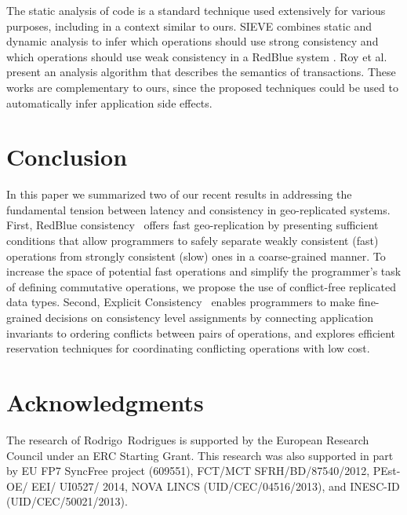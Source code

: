 \documentclass[11pt,dvipdfm]{article}
\begin{document}
The static analysis of code is a standard technique used extensively for
various purposes,
including in a context similar to ours.
SIEVE \cite{Li14Automating} combines static and dynamic analysis to infer
which operations should use strong consistency and which operations should
use weak consistency in a RedBlue system \cite{Li2012RedBlue}.
Roy et al. \cite{Roy14Writes} present an analysis algorithm that
describes the semantics of transactions.
These works are complementary to ours, since the proposed techniques
could be used to automatically infer application side effects.

\section{Conclusion}
\label{sec:conc}

In this paper we summarized two of our recent results in addressing the fundamental tension
between latency and consistency in geo-replicated systems. First,
RedBlue consistency~\cite{Li2012RedBlue} offers fast geo-replication by
presenting sufficient conditions that allow programmers to safely separate
weakly consistent (fast) operations from strongly consistent (slow) ones in
a coarse-grained manner. To increase the space of potential fast operations
and simplify the programmer's task of defining commutative operations,
we propose the use of conflict-free replicated data types. Second,  Explicit Consistency~\cite{Balegas2015Indigo}
enables programmers to make fine-grained decisions on consistency level assignments
by connecting application invariants to ordering conflicts between pairs of operations,
and explores efficient reservation techniques for coordinating conflicting operations with
low cost.

\section*{Acknowledgments}

The research of Rodrigo\ Rodrigues is supported by the European Research Council under an ERC Starting Grant.
This research was also supported in part
    by EU FP7 SyncFree project (609551),
    FCT/MCT SFRH/BD/87540/2012, PEst-OE/ EEI/ UI0527/ 2014,
NOVA LINCS (UID/CEC/04516/2013), and INESC-ID (UID/CEC/50021/2013).
\end{document}
